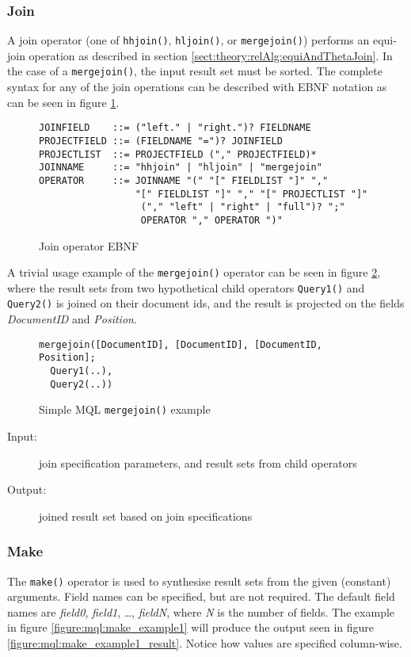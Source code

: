 \subsubsection{Join}
A join operator (one of \texttt{hhjoin()}, \texttt{hljoin()}, or
\texttt{mergejoin()}) performs an equi-join operation as described in section
\ref{sect:theory:relAlg:equiAndThetaJoin}. In the case of a
\texttt{mergejoin()}, the input result set must be sorted. The complete syntax
for any of the join operations can be described with EBNF notation as can be
seen in figure \ref{figure:mql:ebnf:join}.
\begin{figure}[!h]
\centering
\begin{Verbatim}
JOINFIELD    ::= ("left." | "right.")? FIELDNAME
PROJECTFIELD ::= (FIELDNAME "=")? JOINFIELD
PROJECTLIST  ::= PROJECTFIELD ("," PROJECTFIELD)*
JOINNAME     ::= "hhjoin" | "hljoin" | "mergejoin"
OPERATOR     ::= JOINNAME "(" "[" FIELDLIST "]" "," 
                 "[" FIELDLIST "]" "," "[" PROJECTLIST "]"
                  ("," "left" | "right" | "full")? ";"
                  OPERATOR "," OPERATOR ")"
\end{Verbatim}
\caption{Join operator EBNF}
\label{figure:mql:ebnf:join}
\end{figure}
A trivial usage example of the \texttt{mergejoin()} operator can be seen in
figure \ref{figure:mql:mergejoin_example}, where the result sets from two
hypothetical child operators \texttt{Query1()} and \texttt{Query2()} is joined
on their document ids, and the result is projected on the
fields \textit{DocumentID} and \textit{Position}.

\begin{figure}[!h]
\centering
\begin{Verbatim}
mergejoin([DocumentID], [DocumentID], [DocumentID, Position]; 
  Query1(..),
  Query2(..))
\end{Verbatim}
\caption{Simple MQL \texttt{mergejoin()} example}
\label{figure:mql:mergejoin_example}
\end{figure}

\begin{description}
  \item[Input:] join specification parameters, and result sets from child
operators
  \item[Output:] joined result set based on join specifications
\end{description}

\subsubsection{Make}
The \texttt{make()} operator is used to synthesise result sets from the given
(constant) arguments. Field names can be specified, but are not required. The
default field names are \textit{field0}, \textit{field1}, \ldots,
\textit{fieldN}, where \textit{N} is the number of fields. The example in
figure \ref{figure:mql:make_example1} will produce the output seen in figure
\ref{figure:mql:make_example1_result}. Notice how values are specified column-wise.

